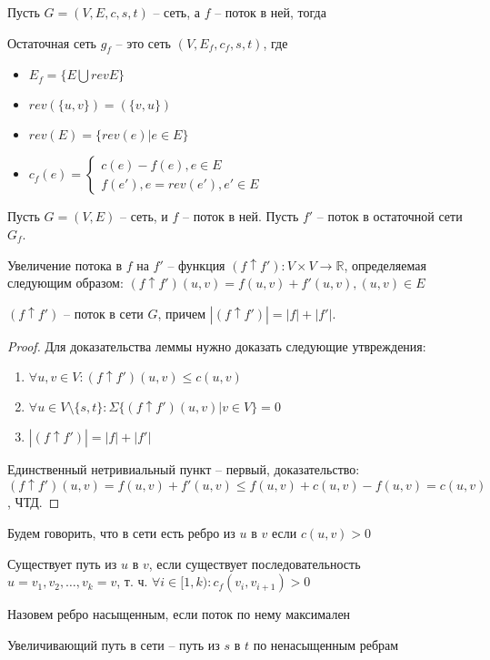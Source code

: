 \noindent Пусть $G = (V, E, c, s, t)$ -- сеть, а $f$ -- поток в ней, тогда
\begin{definition}
    Остаточная сеть $g_f$ -- это сеть $(V, E_f, c_f, s, t)$, где
    \begin{itemize}
        \item $E_f = \{E \bigcup revE\}$
        \item $rev(\{u, v\}) = (\{v, u\})$
        \item $rev(E) = \{rev(e) | e \in E\}$
        \item $c_f(e) = \begin{cases}
            c(e) - f(e), e \in E \\
            f(e'), e = rev(e'), e' \in E
        \end{cases}$
    \end{itemize}
\end{definition}

\noindent Пусть $G = (V, E)$ -- сеть, и $f$ -- поток в ней. Пусть $f'$ -- поток в остаточной сети $G_f$. 
\begin{definition}
    Увеличение потока в $f$ на $f'$ -- функция $(f \uparrow f'): V \times V \rightarrow \mathbb{R}$, определяемая следующим образом:
    $(f \uparrow f')(u, v) = f(u, v) + f'(u, v), (u, v) \in E$
\end{definition}

\begin{lemma}
    $(f \uparrow f')$ -- поток в сети $G$, причем $|(f \uparrow f')| = |f| + |f'|$.
\end{lemma}

\begin{proof}
    Для доказательства леммы нужно доказать следующие утвреждения:
    \begin{enumerate}
        \item $\forall u, v \in V: (f \uparrow f')(u, v) \leq c(u, v)$
        \item $\forall u \in V \setminus \{s, t\}: \Sigma \{(f \uparrow f')(u, v) | v \in V\} = 0$
        \item $|(f \uparrow f')| = |f| + |f'|$
    \end{enumerate}
    Единственный нетривиальный пункт -- первый, доказательство: $(f \uparrow f')(u, v) = f(u, v) + f'(u, v) \leq f(u, v) + c(u, v) - f(u, v) = c(u,v)$, ЧТД.
\end{proof}

\begin{definition}
    Будем говорить, что в сети есть ребро из $u$ в $v$ если $c(u, v) > 0$
\end{definition}
\begin{definition}
    Существует путь из $u$ в $v$, если существует последовательность $u = v_1, v_2, \ldots, v_k = v$, т. ч. $\forall i \in [1, k): c_f(v_i, v_{i+1}) > 0$
\end{definition}
\begin{definition}
    Назовем ребро насыщенным, если поток по нему максимален 
\end{definition}
\begin{definition}
    Увеличивающий путь в сети -- путь из $s$ в $t$ по ненасыщенным ребрам
\end{definition}

